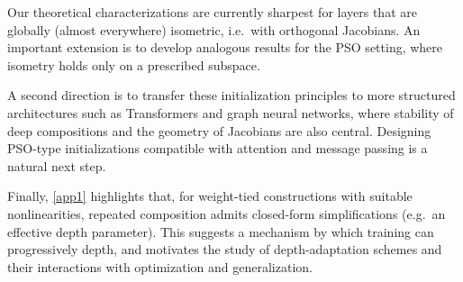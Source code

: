 \documentclass{article}
\theoremstyle{plain}
\theoremstyle{definition}
\theoremstyle{definition}
\theoremstyle{remark}
\theoremstyle{definition}
\theoremstyle{definition}
\theoremstyle{remark}
\numberwithin{equation}{section}
\begin{document}
Our theoretical characterizations are currently sharpest for layers that are globally (almost everywhere) isometric, i.e.\ with orthogonal Jacobians. An important extension is to develop analogous results for the PSO setting, where isometry holds only on a prescribed subspace.

A second direction is to transfer these initialization principles to more structured architectures such as Transformers and graph neural networks, where stability of deep compositions and the geometry of Jacobians are also central. Designing PSO-type initializations compatible with attention and message passing is a natural next step.

Finally, \ref{app1} highlights that, for weight-tied constructions with suitable nonlinearities, repeated composition admits closed-form simplifications (e.g.\ an effective depth parameter). This suggests a mechanism by which training can progressively  depth, and motivates the study of depth-adaptation schemes and their interactions with optimization and generalization.



%


\newpage

\appendix

\onecolumn
\end{document}
